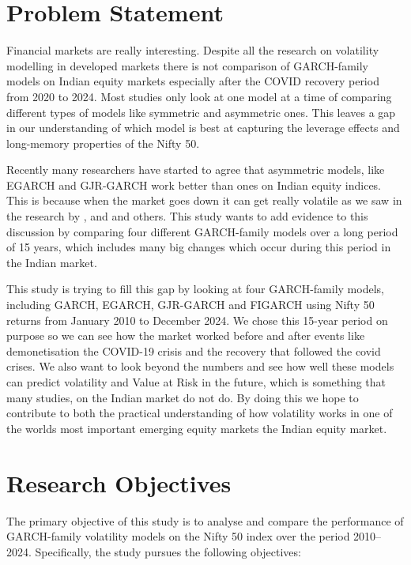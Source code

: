 \section{Problem Statement}
Financial markets are really interesting. Despite all the research on volatility modelling in developed markets there is not comparison of GARCH-family models on Indian equity markets especially after the COVID recovery period from 2020 to 2024. Most studies only look at one model at a time of comparing different types of models like symmetric and asymmetric ones. This leaves a gap in our understanding of which model is best at capturing the leverage effects and long-memory properties of the Nifty 50.

Recently many researchers have started to agree that asymmetric models, like EGARCH and GJR-GARCH work better than ones on Indian equity indices. This is because when the market goes down it can get really volatile as we saw in the research by \citet{mahajan2022}, and \citet{esup3}and others. This study wants to add evidence to this discussion by comparing four different GARCH-family models over a long period of 15 years, which includes many big changes which occur during this period in the Indian market.

This study is trying to fill this gap by looking at four GARCH-family models, including GARCH, EGARCH, GJR-GARCH and FIGARCH using Nifty 50 returns from January 2010 to December 2024. We chose this 15-year period on purpose so we can see how the market worked before and after events like demonetisation the COVID-19 crisis and the recovery that followed the covid crises. We also want to look beyond the numbers and see how well these models can predict volatility and Value at Risk in the future, which is something that many studies, on the Indian market do not do. By doing this we hope to contribute to both the practical understanding of how volatility works in one of the worlds most important emerging equity markets the Indian equity market.



\vspace{5cm}

\section{Research Objectives}

The primary objective of this study is to analyse and compare the performance of GARCH-family volatility models on the Nifty 50 index over the period 2010–2024. Specifically, the study pursues the following objectives:

